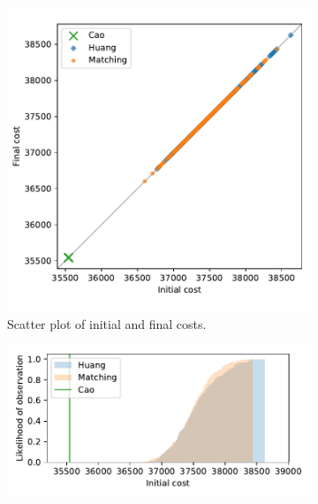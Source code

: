 \documentclass[11pt]{article}
\begin{document}
\begin{figure}
    \begin{subfigure}{.5\textwidth}
        \includegraphics[width=\linewidth]{Fig3a.pdf}
        \caption{Scatter plot of initial and final costs.}
    \end{subfigure}
    \hfill%
    \begin{subfigure}{.5\textwidth}
        \includegraphics[width=\linewidth]{Fig3b1.pdf}


\end{subfigure}
\end{figure}
\end{document}
